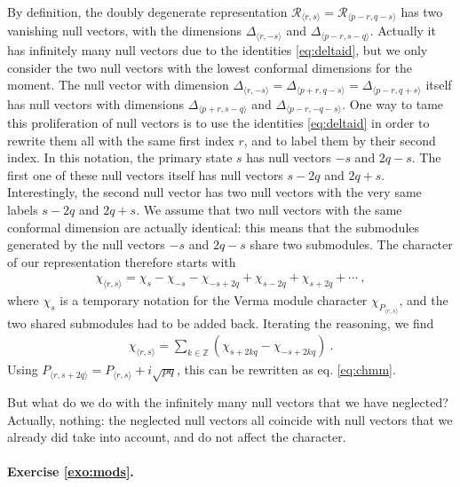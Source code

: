\documentclass[12pt, a4paper]{article}
\theoremstyle{break}
\begin{document}
By definition, the doubly degenerate representation $\mathcal{R}_{\langle r,s\rangle} =\mathcal{R}_{\langle p-r,q-s\rangle}$ has two vanishing null vectors, with the dimensions $\Delta_{\langle r, -s\rangle}$ and $\Delta_{\langle p-r,s-q\rangle}$. Actually it has infinitely many null vectors due to the identities \eqref{eq:deltaid}, but we only consider the two null vectors with the lowest conformal dimensions for the moment. 
The null vector with dimension $\Delta_{\langle r, -s\rangle}=\Delta_{\langle p+r, q-s\rangle} = \Delta_{\langle p-r,q+s\rangle}$ itself has null vectors with dimensions $\Delta_{\langle p+r, s-q\rangle}$ and $\Delta_{\langle p-r,-q-s\rangle}$. One way to tame this proliferation of null vectors is to use the identities \eqref{eq:deltaid} in order to rewrite them all with the same first index $r$, and to label them by their second index. In this notation, the primary state $s$ has null vectors $-s$ and $2q-s$. The first one of these null vectors itself has null vectors $s-2q$ and $2q+s$. Interestingly, the second null vector has two null vectors with the very same labels $s-2q$ and $2q+s$. We assume that two null vectors with the same conformal dimension are actually identical: this means that the submodules generated by the null vectors $-s$ and $2q-s$ share two submodules. The character of our representation therefore starts with 
\begin{align}
 \chi_{\langle r,s\rangle} = \chi_s - \chi_{-s} -\chi_{-s+2q} + \chi_{s-2q} + \chi_{s+2q} + \cdots \ , 
\end{align}
where $\chi_s$ is a temporary notation for the Verma module character $\chi_{P_{\langle r,s\rangle}}$, and the two shared submodules had to be added back. Iterating the reasoning, we find 
\begin{align}
 \chi_{\langle r,s\rangle} = \sum_{k\in\mathbb{Z}} \left(\chi_{s + 2k q} -\chi_{-s+2k q}\right)\ . 
\end{align}
Using $P_{\langle r,s+2q\rangle} = P_{\langle r,s\rangle} + i\sqrt{pq}$, this can be rewritten as eq. \eqref{eq:chmm}.

But what do we do with the infinitely many null vectors that we have neglected? Actually, nothing: the neglected null vectors all coincide with null vectors that we already did take into account, and do not affect the character.

\paragraph{Exercise \ref{exo:mods}.}
\end{document}
